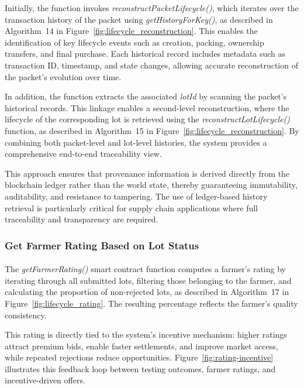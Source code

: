 \documentclass[12pt]{article}
\begin{document}
	Initially, the function invokes \textit{reconstructPacketLifecycle()}, which iterates over the transaction history of the packet using \textit{getHistoryForKey()}, as described in Algorithm~14 in Figure~\ref{fig:lifecycle_reconstruction}. This enables the identification of key lifecycle events such as creation, packing, ownership transfers, and final purchase. Each historical record includes metadata such as transaction ID, timestamp, and state changes, allowing accurate reconstruction of the packet’s evolution over time.
	
	In addition, the function extracts the associated \textit{lotId} by scanning the packet’s historical records. This linkage enables a second-level reconstruction, where the lifecycle of the corresponding lot is retrieved using the \textit{reconstructLotLifecycle()} function, as described in Algorithm~15 in Figure~\ref{fig:lifecycle_reconstruction}. By combining both packet-level and lot-level histories, the system provides a comprehensive end-to-end traceability view.
	
	This approach ensures that provenance information is derived directly from the blockchain ledger rather than the world state, thereby guaranteeing immutability, auditability, and resistance to tampering. The use of ledger-based history retrieval is particularly critical for supply chain applications where full traceability and transparency are required.
	
	
	

	\subsubsection{Get Farmer Rating Based on Lot Status}
	\paragraph{}
	The \textit{getFarmerRating()} smart contract function computes a farmer’s rating by iterating through all submitted lots, filtering those belonging to the farmer, and calculating the proportion of non-rejected lots, as described in Algorithm~17 in Figure~\ref{fig:lifecycle_rating}. The resulting percentage reflects the farmer’s quality consistency.
	
	This rating is directly tied to the system’s incentive mechanism: higher ratings attract premium bids, enable faster settlements, and improve market access, while repeated rejections reduce opportunities. Figure~\ref{fig:rating-incentive} illustrates this feedback loop between testing outcomes, farmer ratings, and incentive-driven offers.
	
\end{document}
